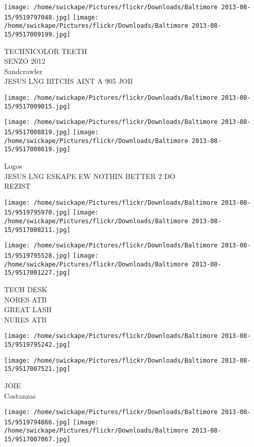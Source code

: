 \documentclass[10pt,letterpaper]{article}
\begin{document}
\texttt{[image: /home/swickape/Pictures/flickr/Downloads/Baltimore 2013-08-15/9519797048.jpg]}
\texttt{[image: /home/swickape/Pictures/flickr/Downloads/Baltimore 2013-08-15/9517009199.jpg]}

TECHNICOLOR TEETH\\
SENZO 2012\\
Sandcrawler\\
JESUS LNG BITCHS AINT A 905 JOB
\pagebreak

\texttt{[image: /home/swickape/Pictures/flickr/Downloads/Baltimore 2013-08-15/9517009015.jpg]}

\vspace{0.25in}
\texttt{[image: /home/swickape/Pictures/flickr/Downloads/Baltimore 2013-08-15/9517008819.jpg]}
\texttt{[image: /home/swickape/Pictures/flickr/Downloads/Baltimore 2013-08-15/9517008619.jpg]}

Logos\\
JESUS LNG ESKAPE EW NOTHIN BETTER 2 DO\\
REZIST
\pagebreak

\texttt{[image: /home/swickape/Pictures/flickr/Downloads/Baltimore 2013-08-15/9519795970.jpg]}
\texttt{[image: /home/swickape/Pictures/flickr/Downloads/Baltimore 2013-08-15/9517008211.jpg]}

\texttt{[image: /home/swickape/Pictures/flickr/Downloads/Baltimore 2013-08-15/9519795528.jpg]}
\texttt{[image: /home/swickape/Pictures/flickr/Downloads/Baltimore 2013-08-15/9517001227.jpg]}

TECH DESK\\
NORES ATB\\
GREAT LASH\\
NURES ATB
\pagebreak

\texttt{[image: /home/swickape/Pictures/flickr/Downloads/Baltimore 2013-08-15/9519795242.jpg]}

\vspace{0.25in}
\texttt{[image: /home/swickape/Pictures/flickr/Downloads/Baltimore 2013-08-15/9517007521.jpg]}

JOIE\\
Costanzas
\pagebreak

\texttt{[image: /home/swickape/Pictures/flickr/Downloads/Baltimore 2013-08-15/9519794866.jpg]}
\texttt{[image: /home/swickape/Pictures/flickr/Downloads/Baltimore 2013-08-15/9517007067.jpg]}
\end{document}
